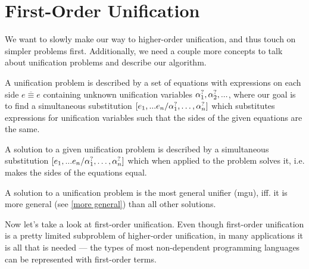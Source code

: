 \documentclass[twoside,12pt,a4paper]{article}
\begin{document}
\begin{prooftree}
\end{prooftree}
\begin{prooftree}
\end{prooftree}    


\section{First-Order Unification}\label{sec:First-Order Unification}

We want to slowly make our way to higher-order unification, and thus touch on simpler problems first. 
Additionally, we need a couple more concepts to talk about unification problems and describe our algorithm. 

A unification problem is described by a set of equations with expressions on each side $\overline{e\equiv e}$ containing unknown unification variables $\alphaunifvar_1, \alphaunifvar_2, ...$, 
where our goal is to find a simultaneous substitution $[\listofexpr / \alphaunifvar_1, \dots, \alphaunifvar_n]$ which substitutes expressions for unification variables
such that the sides of the given equations are the same. 

\begin{definition}[Solution]
    A solution to a given unification problem is described by a simultaneous substitution $[\listofexpr / \alphaunifvar_1, \dots, \alphaunifvar_n]$
    which when applied to the problem solves it, i.e. makes the sides of the equations equal.
\end{definition}
    
\begin{definition}
    A solution to a unification problem is the most general unifier (mgu), iff. it is more general (see \cref{more general}) than all other solutions.
\end{definition} 

Now let's take a look at first-order unification.
Even though first-order unification is a pretty limited subproblem of higher-order unification, 
in many applications it is all that is needed --- the types of most non-dependent programming languages can be represented with first-order terms.
\end{document}

